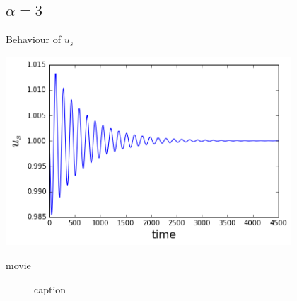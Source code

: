\documentclass{beamer}
\begin{document}
\subsection{$\alpha = 3$}
\begin{frame}{Behaviour of $u_s$}
	\begin{center}
		\includegraphics[height=200pt]{3b}\\
		
	\end{center}	
\end{frame}
\begin{frame}{movie}
	\begin{figure}[h!]
		\centering    
		\caption{caption}
	\end{figure} 
\end{frame}
\end{document}
